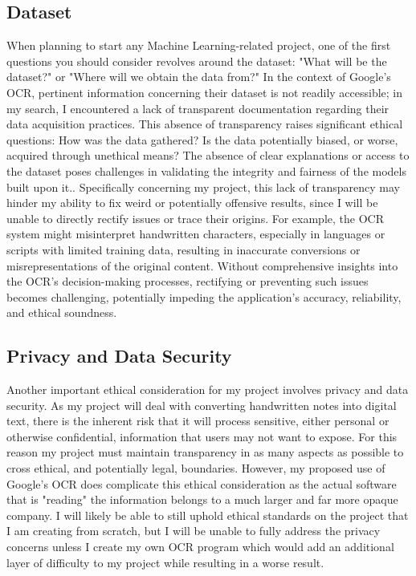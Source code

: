 \documentclass[10pt,twocolumn]{article}
\begin{document}
\subsection{Dataset}
When planning to start any Machine Learning-related project, one of the first questions you should consider revolves around the dataset: "What will be the dataset?" or "Where will we obtain the data from?" In the context of Google's OCR, pertinent information concerning their dataset is not readily accessible; in my search, I encountered a lack of transparent documentation regarding their data acquisition practices. This absence of transparency raises significant ethical questions: How was the data gathered? Is the data potentially biased, or worse, acquired through unethical means? The absence of clear explanations or access to the dataset poses challenges in validating the integrity and fairness of the models built upon it.. Specifically concerning my project, this lack of transparency may hinder my ability to fix weird or potentially offensive results, since I will be unable to directly rectify issues or trace their origins. For example, the OCR system might misinterpret handwritten characters, especially in languages or scripts with limited training data, resulting in inaccurate conversions or misrepresentations of the original content. Without comprehensive insights into the OCR's decision-making processes, rectifying or preventing such issues becomes challenging, potentially impeding the application's accuracy, reliability, and ethical soundness.

\subsection{Privacy and Data Security}
Another important ethical consideration for my project involves privacy and data security. As my project will deal with converting handwritten notes into digital text, there is the inherent risk that it will process sensitive, either personal or otherwise confidential,  information that users may not want to expose. For this reason my project must maintain transparency in as many aspects as possible to cross ethical, and potentially legal, boundaries. However, my proposed use of Google's OCR does complicate this ethical consideration as the actual software that is "reading" the information belongs to a much larger and far more opaque company. I will likely be able to still uphold ethical standards on the project that I am creating from scratch, but I will be unable to fully address the privacy concerns unless I create my own OCR program which would add an additional layer of difficulty to my project while resulting in a worse result. 
\end{document}
